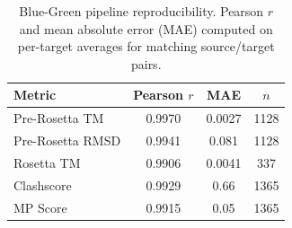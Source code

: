 \begin{table}[htbp]
\centering
\caption{Blue-Green pipeline reproducibility. Pearson $r$ and mean absolute error (MAE) computed on per-target averages for matching source/target pairs.}
\label{tab:reproducibility}
\begin{tabular}{lccc}
\toprule
Metric & Pearson $r$ & MAE & $n$ \\
\midrule
  Pre-Rosetta TM & 0.9970 & 0.0027 & 1128 \\
  Pre-Rosetta RMSD & 0.9941 & 0.081 & 1128 \\
  Rosetta TM & 0.9906 & 0.0041 & 337 \\
  Clashscore & 0.9929 & 0.66 & 1365 \\
  MP Score & 0.9915 & 0.05 & 1365 \\
\bottomrule
\end{tabular}
\end{table}
